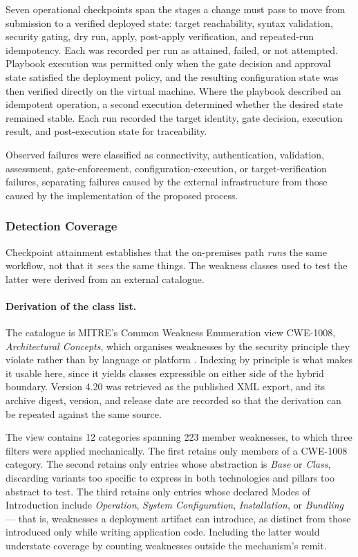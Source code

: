 Seven operational checkpoints span the stages a change must pass to move from
submission to a verified deployed state: target reachability, syntax validation,
security gating, dry run, apply, post-apply verification, and repeated-run
idempotency. Each was recorded per run as attained, failed, or not attempted.
Playbook execution was permitted only when the gate decision and approval state
satisfied the deployment policy, and the resulting configuration state was then
verified directly on the virtual machine. Where the playbook described an
idempotent operation, a second execution determined whether the desired state
remained stable. Each run recorded the target identity, gate decision, execution
result, and post-execution state for traceability.

Observed failures were classified as connectivity, authentication, validation,
assessment, gate-enforcement, configuration-execution, or target-verification
failures, separating failures caused by the external infrastructure from those
caused by the implementation of the proposed process.

\subsubsection{Detection Coverage}

Checkpoint attainment establishes that the on-premises path \emph{runs} the same
workflow, not that it \emph{sees} the same things. The weakness classes used to
test the latter were derived from an external catalogue.

\paragraph{Derivation of the class list.}
The catalogue is MITRE's Common Weakness Enumeration view CWE-1008,
\emph{Architectural Concepts}, which organises weaknesses by the security
principle they violate rather than by language or platform \cite{MITRE_CWE1008}.
Indexing by principle is what makes it usable here, since it yields classes
expressible on either side of the hybrid boundary. Version 4.20 was retrieved as
the published XML export, and its archive digest, version, and release date are
recorded so that the derivation can be repeated against the same source.

The view contains 12 categories spanning 223 member weaknesses, to which three
filters were applied mechanically. The first retains only members of a CWE-1008
category. The second retains only entries whose abstraction is \emph{Base} or
\emph{Class}, discarding variants too specific to express in both technologies
and pillars too abstract to test. The third retains only entries whose declared
Modes of Introduction include \emph{Operation}, \emph{System Configuration},
\emph{Installation}, or \emph{Bundling} --- that is, weaknesses a deployment
artifact can introduce, as distinct from those introduced only while writing
application code. Including the latter would understate coverage by counting
weaknesses outside the mechanism's remit.

